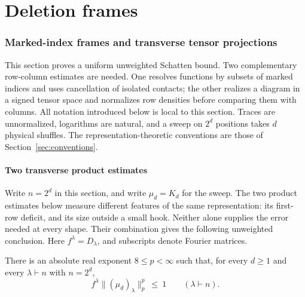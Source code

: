\part{Deletion frames}\label{part:frames}
\section{Marked-index frames and transverse tensor projections}
\label{ten:frames}
This section proves a uniform unweighted Schatten bound. Two complementary row-column estimates are needed. One resolves functions by subsets of marked indices and uses cancellation of isolated contacts; the other realizes a diagram in a signed tensor space and normalizes row densities before comparing them with columns.
\smallskip
All notation introduced below is local to this section. Traces are unnormalized, logarithms are natural, and a sweep on $2^d$ positions takes $d$ physical shuffles. The representation-theoretic conventions are those of Section~\ref{sec:conventions}.

\subsection{Two transverse product estimates}
\label{ten:frames:part:1}
Write $n=2^d$ in this section, and write $\mu_d=K_d$ for the sweep. The two product estimates below measure different features of the same representation: its first-row deficit, and its size outside a small hook. Neither alone supplies the error needed at every shape. Their combination gives the following unweighted conclusion. Here $f^\lambda=D_\lambda$, and subscripts denote Fourier matrices.

\begin{proposition}
\label{ten:frames:main}
There is an absolute real exponent $8\le p<\infty$ such that, for every $d\ge1$ and every $\lambda\vdash n$ with $n=2^d$,
\begin{equation}
 f^\lambda \|(\mu_d)_\lambda\|_p^p \ \le\ 1\qquad (\lambda\vdash n).
 \label{ten:frames:eq:1}
\end{equation}

\end{proposition}

